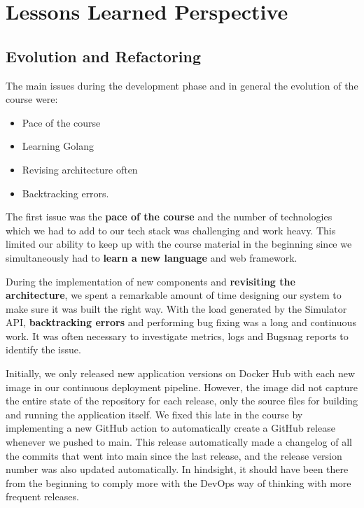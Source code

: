 \section{Lessons Learned Perspective}
\label{learned-perspective}

\subsection{Evolution and Refactoring}
The main issues during the development phase and in general the evolution of the course were:
\begin{itemize}
    \item Pace of the course
    \item Learning Golang
    \item Revising architecture often
    \item Backtracking errors.
\end{itemize}

The first issue was the \textbf{pace of the course} and the number of technologies which we had to add to our tech stack was challenging and work heavy. This limited our ability to keep up with the course material in the beginning since we simultaneously had to \textbf{learn a new language} and web framework. 

During the implementation of new components and \textbf{revisiting the architecture}, we spent a remarkable amount of time designing our system to make sure it was built the right way. With the load generated by the Simulator API, \textbf{backtracking errors} and performing bug fixing was a long and continuous work. It was often necessary to investigate metrics, logs and Bugsnag reports to identify the issue. 

Initially, we only released new application versions on Docker Hub with each new image in our continuous deployment pipeline. However, the image did not capture the entire state of the repository for each release, only the source files for building and running the application itself. We fixed this late in the course by implementing a new GitHub action to automatically create a GitHub release whenever we pushed to main. This release automatically made a changelog of all the commits that went into main since the last release, and the release version number was also updated automatically. In hindsight, it should have been there from the beginning to comply more with the DevOps way of thinking with more frequent releases. 

